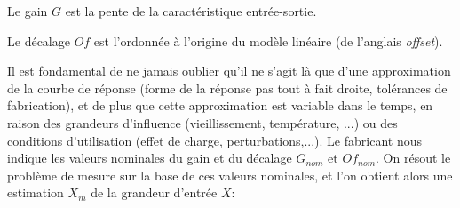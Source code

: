 \begin{definition}
	Le gain $G$ est la pente de la caractéristique entrée-sortie.
\end{definition}

\begin{definition}
	Le décalage $Of$ est l'ordonnée à l'origine du modèle linéaire (de l'anglais \emph{offset}).
\end{definition}

Il est fondamental de ne jamais oublier qu'il ne s'agit là que d'une approximation de la courbe de réponse (forme de la réponse pas tout à fait droite, tolérances de fabrication), et de plus que cette approximation est variable dans le temps, en raison des grandeurs d'influence (vieillissement, température, ...) ou des conditions d'utilisation (effet de charge, perturbations,...). Le fabricant nous indique les valeurs nominales du gain et du décalage $G_{nom}$ et $Of_{nom}$.
On résout le problème de mesure sur la base de ces valeurs nominales, et l'on obtient alors une estimation $X_{m}$ de la grandeur d'entrée $X$:

\begin{center}
\end{center}

